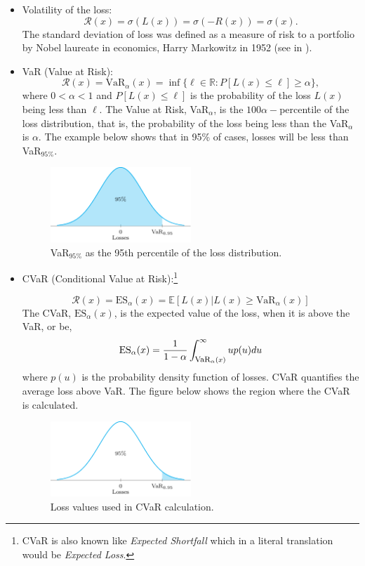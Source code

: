 \begin{itemize}
\item Volatility of the loss:
\[
\mathcal{R}(x) = \sigma(L(x)) =\sigma(-R(x)) = \sigma (x).
\]
The standard deviation of loss was defined as a measure of risk to a portfolio by Nobel laureate in economics, Harry
Markowitz in 1952 (see in \cite{Markowitz1952}).

\item VaR (Value at Risk):
\begin{equation}
\mathcal{R}(x) = \mbox{VaR}_\alpha(x) = \inf\{\ell\in\mathbb{R} : P[L(x)\leq \ell]\geq \alpha \},
\end{equation}
where $0<\alpha<1$ and $P[L(x)\leq \ell]$ is the probability of the loss $L(x)$ being less than $\ell$. The Value at Risk, VaR$_\alpha$, is the $100\alpha-$percentile of the loss distribution, that is, the probability of the loss being less than the VaR$_\alpha$ is $\alpha$. The example below shows that in 95\% of cases, losses will be less than VaR$_{95\%}$.

\begin{figure}[!h]
\centering
\includegraphics[width=0.5\textwidth]{figures/VaR}
\caption{VaR$_{95\%}$ as the 95th percentile of the loss distribution.}
\end{figure}

\item CVaR (Conditional Value at Risk):\footnote{CVaR is also known
like \emph{Expected Shortfall} which in a literal translation would be
\emph{Expected Loss}.}

\begin{equation*}
\mathcal{R}(x) =\mbox{ES}_\alpha (x) = \mathbb{E}[L(x)|L(x)\geq \mbox{VaR}_\alpha(x)]
\end{equation*}
The CVaR, $\mbox{ES}_\alpha (x)$, is the expected value of the loss, when it is above the VaR, or
be,
\begin{equation}
\mbox{ES}_\alpha(x) = \frac{1}{1-\alpha}\int_{\mbox{\footnotesize{VaR}}_\alpha(x)}^\infty u p(u)du
\end{equation}
where $p(u)$ is the probability density function of losses. CVaR quantifies the average loss above VaR. The figure below shows the region where the CVaR is calculated.
\begin{figure}[!h]
\centering
\includegraphics[width=0.5\textwidth]{figures/CVaR}
\caption{Loss values used in CVaR calculation.}
\end{figure}
\end{itemize}

